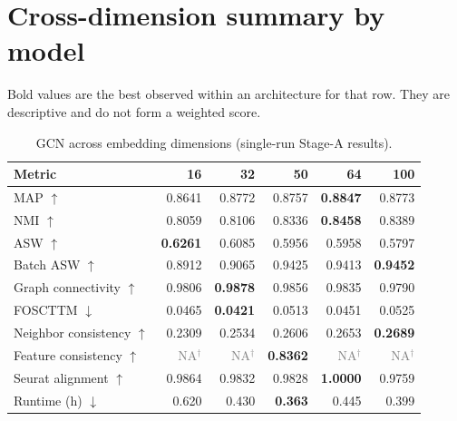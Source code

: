 \documentclass[10pt]{article}
\begin{document}
\section{Cross-dimension summary by model}
Bold values are the best observed within an architecture for that row. They are descriptive and do not form a weighted score.
\begin{table}[H]
\centering
\scriptsize
\caption{GCN across embedding dimensions (single-run Stage-A results).}
\begin{tabular}{@{}lrrrrr@{}}
\toprule
Metric & 16 & 32 & 50 & 64 & 100 \\
\midrule
MAP $\uparrow$ & 0.8641 & 0.8772 & 0.8757 & \textbf{0.8847} & 0.8773 \\
NMI $\uparrow$ & 0.8059 & 0.8106 & 0.8336 & \textbf{0.8458} & 0.8389 \\
ASW $\uparrow$ & \textbf{0.6261} & 0.6085 & 0.5956 & 0.5958 & 0.5797 \\
Batch ASW $\uparrow$ & 0.8912 & 0.9065 & 0.9425 & 0.9413 & \textbf{0.9452} \\
Graph connectivity $\uparrow$ & 0.9806 & \textbf{0.9878} & 0.9856 & 0.9835 & 0.9790 \\
FOSCTTM $\downarrow$ & 0.0465 & \textbf{0.0421} & 0.0513 & 0.0451 & 0.0525 \\
Neighbor consistency $\uparrow$ & 0.2309 & 0.2534 & 0.2606 & 0.2653 & \textbf{0.2689} \\
Feature consistency $\uparrow$ & \textcolor{gray}{NA$^{\dagger}$} & \textcolor{gray}{NA$^{\dagger}$} & \textbf{0.8362} & \textcolor{gray}{NA$^{\dagger}$} & \textcolor{gray}{NA$^{\dagger}$} \\
Seurat alignment $\uparrow$ & 0.9864 & 0.9832 & 0.9828 & \textbf{1.0000} & 0.9759 \\
Runtime (h) $\downarrow$ & 0.620 & 0.430 & \textbf{0.363} & 0.445 & 0.399 \\
\bottomrule
\end{tabular}
\end{table}
\end{document}
